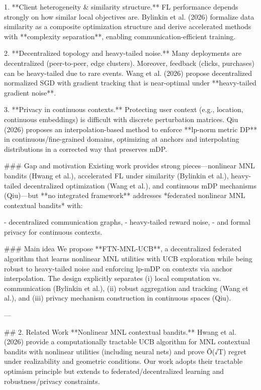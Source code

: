 1. **Client heterogeneity & similarity structure.** FL performance depends strongly on how similar local objectives are. Bylinkin et al. (2026) formalize data similarity as a composite optimization structure and derive accelerated methods with **complexity separation**, enabling communication-efficient training.

2. **Decentralized topology and heavy-tailed noise.** Many deployments are decentralized (peer-to-peer, edge clusters). Moreover, feedback (clicks, purchases) can be heavy-tailed due to rare events. Wang et al. (2026) propose decentralized normalized SGD with gradient tracking that is near-optimal under **heavy-tailed gradient noise**.

3. **Privacy in continuous contexts.** Protecting user context (e.g., location, continuous embeddings) is difficult with discrete perturbation matrices. Qiu (2026) proposes an interpolation-based method to enforce **lp-norm metric DP** in continuous/fine-grained domains, optimizing at anchors and interpolating distributions in a corrected way that preserves mDP.

### Gap and motivation  
Existing work provides strong pieces—nonlinear MNL bandits (Hwang et al.), accelerated FL under similarity (Bylinkin et al.), heavy-tailed decentralized optimization (Wang et al.), and continuous mDP mechanisms (Qiu)—but **no integrated framework** addresses *federated nonlinear MNL contextual bandits* with:

- decentralized communication graphs,
- heavy-tailed reward noise,
- and formal privacy for continuous contexts.

### Main idea  
We propose **FTN-MNL-UCB**, a decentralized federated algorithm that learns nonlinear MNL utilities with UCB exploration while being robust to heavy-tailed noise and enforcing lp-mDP on contexts via anchor interpolation. The design explicitly separates (i) local computation vs. communication (Bylinkin et al.), (ii) robust aggregation and tracking (Wang et al.), and (iii) privacy mechanism construction in continuous spaces (Qiu).

---

## 2. Related Work  
**Nonlinear MNL contextual bandits.** Hwang et al. (2026) provide a computationally tractable UCB algorithm for MNL contextual bandits with nonlinear utilities (including neural nets) and prove \~O(√T) regret under realizability and geometric conditions. Our work adopts their tractable optimism principle but extends to federated/decentralized learning and robustness/privacy constraints.

